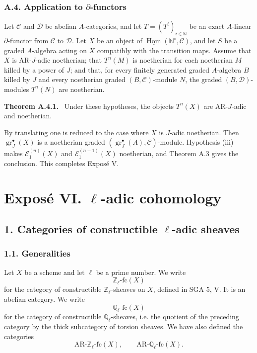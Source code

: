 \documentclass[12pt]{article}
\newcommand{\bZ}{\mathbb Z}
\newcommand{\bQ}{\mathbb Q}
\newcommand{\bN}{\mathbb N}
\newcommand{\cC}{\mathcal C}
\newcommand{\cD}{\mathcal D}
\newcommand{\cE}{\mathcal E}
\newcommand{\Hom}{\operatorname{Hom}}
\newcommand{\gr}{\operatorname{gr}}
\newcommand{\fc}{\mathrm{fc}}
\newcommand{\AR}{\mathrm{AR}}
\newenvironment{statement}[1]{\par\medskip\noindent\textbf{#1.}\ }{\par\medskip}
\begin{document}
\subsubsection*{A.4. Application to $\partial$-functors}

Let $\cC$ and $\cD$ be abelian $A$-categories, and let
$T=(T^i)_{i\in\bN}$ be an exact $A$-linear $\partial$-functor from $\cC$ to $\cD$.
Let $X$ be an object of $\underline{\Hom}(\bN^\circ,\cC)$, and let $S$ be a graded
$A$-algebra acting on $X$ compatibly with the transition maps. Assume that $X$ is
AR-$J$-adic noetherian; that $T^n(M)$ is noetherian for each noetherian $M$ killed
by a power of $J$; and that, for every finitely generated graded $A$-algebra $B$
killed by $J$ and every noetherian graded $(B,\cC)$-module $N$, the graded
$(B,\cD)$-modules $T^n(N)$ are noetherian.

\begin{statement}{Theorem A.4.1}
Under these hypotheses, the objects $T^n(X)$ are AR-$J$-adic and noetherian.
\end{statement}

By translating one is reduced to the case where $X$ is $J$-adic noetherian. Then
$\gr_J^\bullet(X)$ is a noetherian graded
$(\gr_J^\bullet(A),\cC)$-module. Hypothesis (iii) makes
$\cE_1^{(n)}(X)$ and $\cE_1^{(n-1)}(X)$ noetherian, and Theorem A.3 gives the
conclusion. This completes Exposé V.

\newpage

\section*{Exposé VI. $\ell$-adic cohomology}

\subsection*{1. Categories of constructible $\ell$-adic sheaves}

\subsubsection*{1.1. Generalities}

Let $X$ be a scheme and let $\ell$ be a prime number. We write
\[
       \bZ_\ell\text{-}\fc(X)
\]
for the category of constructible $\bZ_\ell$-sheaves on $X$, defined in SGA 5, V.
It is an abelian category. We write
\[
       \bQ_\ell\text{-}\fc(X)
\]
for the category of constructible $\bQ_\ell$-sheaves, i.e. the quotient of the
preceding category by the thick subcategory of torsion sheaves. We have also defined
the categories
\[
       \AR\text{-}\bZ_\ell\text{-}\fc(X),
       \qquad
       \AR\text{-}\bQ_\ell\text{-}\fc(X).
\]
\end{document}

